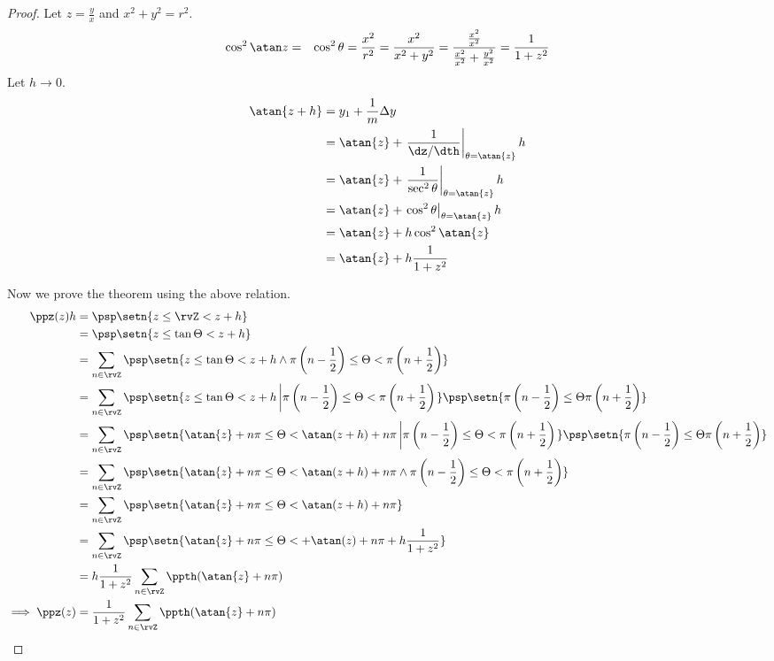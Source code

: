 \begin{proof}
Let $z=\frac{y}{x}$ and $x^2 + y^2 = r^2$.
\begin{align*}
  \cos^2\atan z
    &=& \cos^2\theta
     =  \frac{x^2}{r^2}
     =  \frac{x^2}{x^2+y^2}
     =  \frac{\frac{x^2}{x^2}}{\frac{x^2}{x^2}+\frac{y^2}{x^2}}
     =  \frac{1}{1+z^2}
\end{align*}
Let $h\to0$.
\begin{align*}
  \atan{z+h}
    &=    y_1 + \frac{1}{m} \Delta y
  \\&=    \atan{z} + \left.\frac{1}{\dz/\dth}\right|_{\theta=\atan{z}} h
  \\&=    \atan{z} + \left.\frac{1}{\sec^2\theta}\right|_{\theta=\atan{z}} h
  \\&=    \atan{z} + \left.\cos^2\theta\right|_{\theta=\atan{z}} h
  \\&=    \atan{z} + h\cos^2\atan{z}
  \\&=    \atan{z} + h\frac{1}{1+z^2}
\end{align*}

Now we prove the theorem using the above relation.
\begin{align*}
  \ppz(z)h
    &=    \psp\setn{z\le \rvZ < z+h}
  \\&=    \psp\setn{z\le \tan\Theta < z+h}
  \\&=    \sum_{n\in\rvZ}\psp\setn{z\le \tan\Theta < z+h \land
                 \pi\left(n-\frac{1}{2}\right) \le \Theta < \pi\left(n+\frac{1}{2}\right)
                 }
  \\&=    \sum_{n\in\rvZ}\psp\setn{z\le \tan\Theta < z+h \left|
                 \pi\left(n-\frac{1}{2}\right) \le \Theta < \pi\left(n+\frac{1}{2}\right)
                 \right.}
                 \psp\setn{\pi\left(n-\frac{1}{2}\right) \le \Theta \pi\left(n+\frac{1}{2}\right)}
  \\&=    \sum_{n\in\rvZ}\psp\setn{\atan{z}+n\pi \le \Theta < \atan(z+h)+n\pi \left|
                 \pi\left(n-\frac{1}{2}\right) \le \Theta < \pi\left(n+\frac{1}{2}\right)
                 \right.}
                 \psp\setn{\pi\left(n-\frac{1}{2}\right) \le \Theta \pi\left(n+\frac{1}{2}\right)}
  \\&=    \sum_{n\in\rvZ}\psp\setn{\atan{z}+n\pi \le \Theta < \atan(z+h)+n\pi \land
                 \pi\left(n-\frac{1}{2}\right) \le \Theta < \pi\left(n+\frac{1}{2}\right)
                 }
  \\&=    \sum_{n\in\rvZ}\psp\setn{\atan{z}+n\pi \le \Theta < \atan(z+h)+n\pi }
  \\&=    \sum_{n\in\rvZ}\psp\setn{\atan{z}+n\pi \le \Theta < +\atan(z)+n\pi + h\frac{1}{1+z^2} }
  \\&=    h\frac{1}{1+z^2} \sum_{n\in\rvZ}\ppth(\atan{z}+n\pi)
\\\implies
  \ppz(z) &=  \frac{1}{1+z^2} \sum_{n\in\rvZ}\ppth(\atan{z}+n\pi)
\end{align*}


\end{proof}
